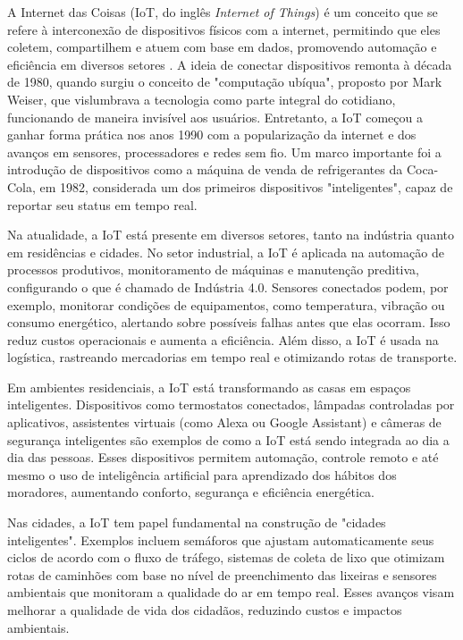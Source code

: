 A Internet das Coisas (IoT, do inglês \textit{Internet of Things}) é um conceito que se refere à interconexão de dispositivos físicos com a internet, permitindo que eles coletem, compartilhem e atuem com base em dados, promovendo automação e eficiência em diversos setores \cite{gokhale2018introduction}. A ideia de conectar dispositivos remonta à década de 1980, quando surgiu o conceito de "computação ubíqua", proposto por Mark Weiser, que vislumbrava a tecnologia como parte integral do cotidiano, funcionando de maneira invisível aos usuários. Entretanto, a IoT começou a ganhar forma prática nos anos 1990 com a popularização da internet e dos avanços em sensores, processadores e redes sem fio. Um marco importante foi a introdução de dispositivos como a máquina de venda de refrigerantes da Coca-Cola, em 1982, considerada um dos primeiros dispositivos "inteligentes", capaz de reportar seu status em tempo real.

Na atualidade, a IoT está presente em diversos setores, tanto na indústria quanto em residências e cidades. No setor industrial, a IoT é aplicada na automação de processos produtivos, monitoramento de máquinas e manutenção preditiva, configurando o que é chamado de Indústria 4.0. Sensores conectados podem, por exemplo, monitorar condições de equipamentos, como temperatura, vibração ou consumo energético, alertando sobre possíveis falhas antes que elas ocorram. Isso reduz custos operacionais e aumenta a eficiência. Além disso, a IoT é usada na logística, rastreando mercadorias em tempo real e otimizando rotas de transporte.

Em ambientes residenciais, a IoT está transformando as casas em espaços inteligentes. Dispositivos como termostatos conectados, lâmpadas controladas por aplicativos, assistentes virtuais (como Alexa ou Google Assistant) e câmeras de segurança inteligentes são exemplos de como a IoT está sendo integrada ao dia a dia das pessoas. Esses dispositivos permitem automação, controle remoto e até mesmo o uso de inteligência artificial para aprendizado dos hábitos dos moradores, aumentando conforto, segurança e eficiência energética.

Nas cidades, a IoT tem papel fundamental na construção de "cidades inteligentes". Exemplos incluem semáforos que ajustam automaticamente seus ciclos de acordo com o fluxo de tráfego, sistemas de coleta de lixo que otimizam rotas de caminhões com base no nível de preenchimento das lixeiras e sensores ambientais que monitoram a qualidade do ar em tempo real. Esses avanços visam melhorar a qualidade de vida dos cidadãos, reduzindo custos e impactos ambientais.

